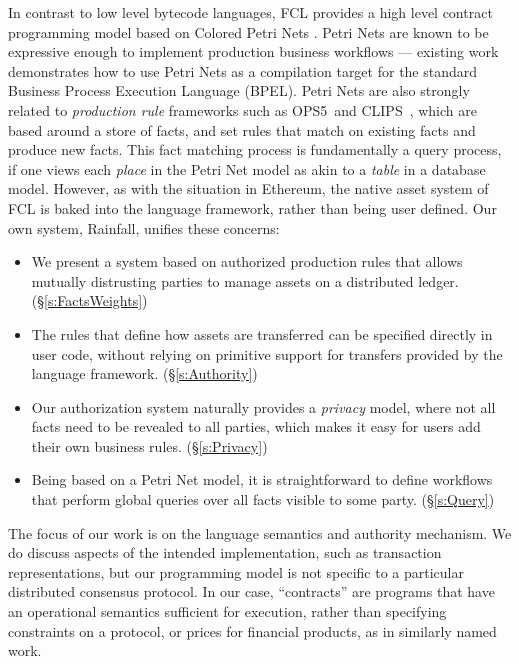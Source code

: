 In contrast to low level bytecode languages, FCL provides a high level contract programming model based on Colored Petri Nets \CITE. Petri Nets are known to be expressive enough to implement production business workflows --- existing work demonstrates how to use Petri Nets as a compilation target for the standard Business Process Execution Language (BPEL). Petri Nets are also strongly related to \emph{production rule} frameworks such as OPS5~\CITE and CLIPS~\CITE, which are based around a store of facts, and set rules that match on existing facts and produce new facts. This fact matching process is fundamentally a query process, if one views each \emph{place} in the Petri Net model as akin to a \emph{table} in a database model. However, as with the situation in Ethereum, the native asset system of FCL is baked into the language framework, rather than being user defined. Our own system, Rainfall, unifies these concerns:

\begin{itemize}
\item We present a system based on authorized production rules that allows mutually distrusting parties to manage assets on a distributed ledger. (\S\ref{s:FactsWeights})

\item The rules that define how assets are transferred can be specified directly in user code, without relying on primitive support for transfers provided by the language framework. (\S\ref{s:Authority})

\item Our authorization system naturally provides a \emph{privacy} model, where not all facts need to be revealed to all parties, which makes it easy for users add their own business rules. (\S\ref{s:Privacy})

\item Being based on a Petri Net model, it is straightforward to define workflows that perform global queries over all facts visible to some party. (\S\ref{s:Query})

\end{itemize}

The focus of our work is on the language semantics and authority mechanism. We do discuss aspects of the intended implementation, such as transaction representations, but our programming model is not specific to a particular distributed consensus protocol. In our case, ``contracts'' are programs that have an operational semantics sufficient for execution, rather than specifying constraints on a protocol, or prices for financial products, as in similarly named work.




